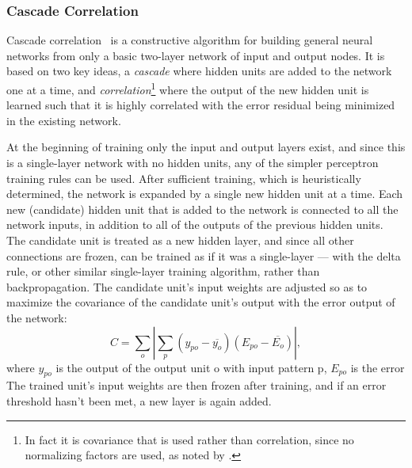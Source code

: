 \documentclass[thesis]{subfiles}
\begin{document}
	\subsubsection{Cascade Correlation}
	Cascade correlation~\citep{Fahlman1989} is a constructive algorithm for building general neural networks from only a basic two-layer network of input and output nodes. It is based on two key ideas, a \emph{cascade} where hidden units are added to the network one at a time, and \emph{correlation}\footnote{In fact it is covariance that is used rather than correlation, since no normalizing factors are used, as noted by \citet{Fahlman1989}.} where the output of the new hidden unit is learned such that it is highly correlated with the error residual being minimized in the existing network.
	
	
	At the beginning of training only the input and output layers exist,
	and since this is a single-layer network with no hidden units, any of the simpler perceptron training rules can be used. After sufficient training, which is heuristically determined, the network is expanded by a single new hidden unit at a time.
	Each new (candidate) hidden unit that is added to the network is connected to all the network inputs, in addition to all of the outputs of the previous hidden units. The candidate unit is treated as a new hidden layer, and since all other connections are frozen, can be trained as if it was a single-layer --- \ie with the delta rule, or other similar single-layer training algorithm, rather than backpropagation. The candidate unit's input weights are adjusted so as to maximize the covariance of the candidate unit's output with the error output of the network:
	\begin{equation}
	    C = \sum_o \left|\sum_p (y_{po} - \overline{y_o})(E_{po} - \overline{E_o})\right|,
	\end{equation}
	where $y_{po}$ is the output of the output unit o with input pattern p, $E_{po}$ is the error The trained unit's input weights are then frozen after training, and if an error threshold hasn't been met, a new layer is again added.
	
\end{document}
